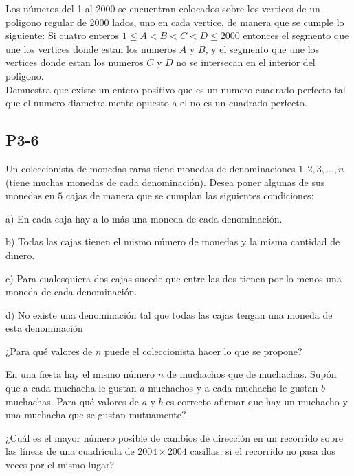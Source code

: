 \documentclass[11pt]{scrartcl}
\begin{document}
\begin{problem} [2023/2]
    Los números del 1 al 2000 se encuentran colocados sobre los vertices de un poligono regular de 2000 lados, uno en cada vertice, de manera que se cumple lo siguiente: 
    Si cuatro enteros $1 \leq A < B < C < D \leq 2000$ entonces el segmento que une los vertices donde estan los numeros $A$ y $B$, y el segmento que une los vertices donde estan los numeros $C$ y $D$ no se intersecan en el interior del poligono.  \\
    Demuestra que existe un entero positivo que es un numero cuadrado perfecto tal que el numero diametralmente opuesto a el no es un cuadrado perfecto.
\end{problem}
\subsection{P3-6} 
\begin{problem}
    [2001/6] 
    Un coleccionista de monedas raras tiene monedas de denominaciones $1,2,3,\dots,n$ (tiene muchas monedas de cada denominación). Desea poner algunas de sus monedas en $5$ cajas de manera que se cumplan las siguientes condiciones:

a) En cada caja hay a lo más una moneda de cada denominación.

b) Todas las cajas tienen el mismo número de monedas y la misma cantidad de dinero.

c) Para cualesquiera dos cajas sucede que entre las dos tienen por lo menos una moneda de cada denominación.

d) No existe una denominación tal que todas las cajas tengan una moneda de esta denominación

¿Para qué valores de $n$ puede el coleccionista hacer lo que se propone?
\end{problem}
\begin{problem}
    [2003/3]
    En una fiesta hay el mismo número $n$ de muchachos que de muchachas. Supón que a cada muchacha le gustan $a$ muchachos y a cada muchacho le gustan $b$ muchachas. Para qué valores de $a$ y $b$ es correcto afirmar que hay un muchacho y una muchacha que se gustan mutuamente?
    
\end{problem}
\begin{problem}
    [2004/6] 
    ¿Cuál es el mayor número posible de cambios de dirección en un recorrido sobre las líneas de una cuadrícula de $2004\times 2004$ casillas, si el recorrido no pasa dos veces por el mismo lugar?
\end{problem}
\end{document}
